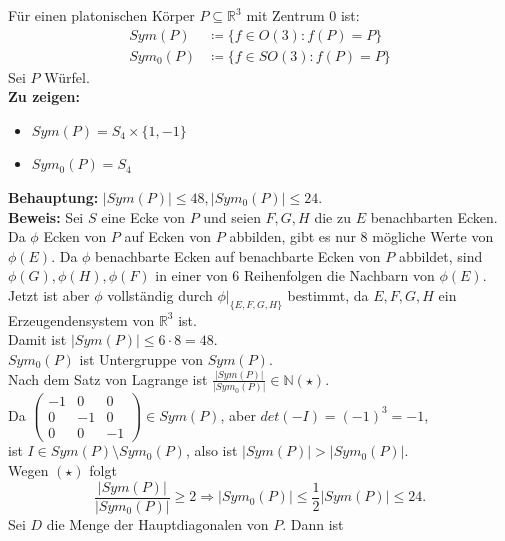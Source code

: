 \begin{problem*}[3]

Für einen platonischen Körper $ P \subseteq \mathbb{R}^3 $ mit Zentrum $ 0 $ ist:
\begin{align*}
   Sym(P) &\coloneqq \{ f \in O(3) : f(P) = P \} \\
   Sym_0(P) &\coloneqq \{ f \in SO(3) : f(P) = P \}
 \end{align*} 
Sei $ P $ Würfel. \\
\textbf{Zu zeigen:} 
\begin{itemize}
  \item $Sym(P) = S_4 \times \{ 1, -1 \}$
  \item $Sym_0(P) = S_4$
\end{itemize}
\textbf{Behauptung:} 
$\vert Sym(P) \vert \leq 48, \vert Sym_0(P) \vert \leq 24$.\\
\textbf{Beweis:} Sei $ S $ eine Ecke von $ P $ und seien $ F,G,H $ die zu $ E $ benachbarten Ecken. Da $\phi$ Ecken von $ P $ auf Ecken von $ P $ abbilden, gibt es nur 8 mögliche Werte von $\phi(E)$. Da $ \phi $ benachbarte Ecken auf benachbarte Ecken von $ P $ abbildet, sind $\phi(G), \phi(H), \phi(F)$ in einer von 6 Reihenfolgen die Nachbarn von $ \phi(E) $. Jetzt ist aber $ \phi $ vollständig durch $\phi|_{\{ E,F,G,H \}}$ bestimmt, da $ E,F,G,H $ ein Erzeugendensystem von $\mathbb{R}^3$ ist.\\
Damit ist $ \vert Sym(P) \vert \leq 6 \cdot 8 = 48$. \\
$Sym_0(P) $ ist Untergruppe von $ Sym(P) $. \\
Nach dem Satz von Lagrange ist $\frac{\vert Sym(P) \vert}{\vert Sym_0(P) \vert} \in \mathbb{N} (\star)$.\\
Da $\begin{pmatrix}
	-1 & 0 & 0 \\
	0 & -1 & 0 \\
	0 & 0 & -1 
\end{pmatrix} \in Sym(P)$, aber $det(-I) = (-1)^3 = -1$,\\
ist $I \in Sym(P) \setminus Sym_0(P)$, also ist $\vert Sym(P) \vert > \vert Sym_0(P) \vert $.\\
Wegen $ (\star) $ folgt
\begin{equation*}
	\frac{\vert Sym(P) \vert}{\vert Sym_0(P) \vert} \geq 2 \Rightarrow \vert Sym_0(P) \vert \leq \frac{1}{2} \vert Sym(P) \vert \leq 24.
\end{equation*}
Sei $ D $ die Menge der Hauptdiagonalen von $ P $. Dann ist 
\begin{equation*}

\end{equation*}
\end{problem*}
